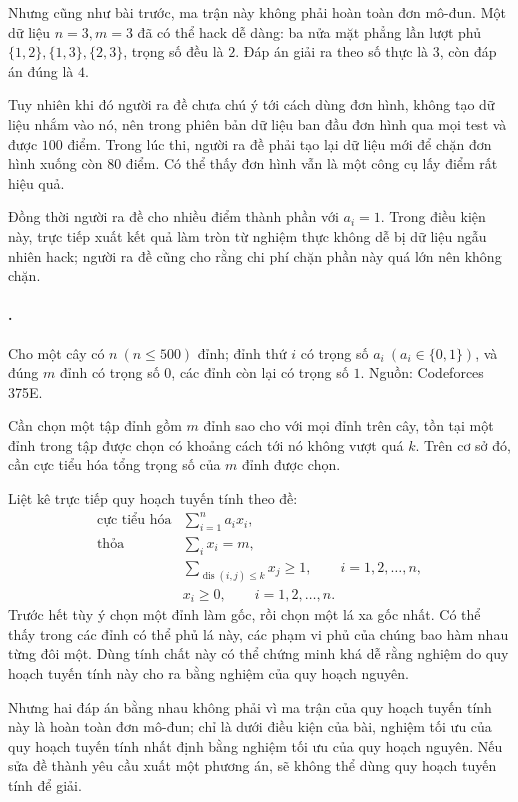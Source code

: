 \documentclass[11pt]{article}
\begin{document}
Nhưng cũng như bài trước, ma trận này không phải hoàn toàn đơn mô-đun. Một dữ
liệu \(n=3,m=3\) đã có thể hack dễ dàng: ba nửa mặt phẳng lần lượt phủ
\(\{1,2\},\{1,3\},\{2,3\}\), trọng số đều là \(2\). Đáp án giải ra theo số
thực là \(3\), còn đáp án đúng là \(4\).

Tuy nhiên khi đó người ra đề chưa chú ý tới cách dùng đơn hình, không tạo dữ
liệu nhắm vào nó, nên trong phiên bản dữ liệu ban đầu đơn hình qua mọi test
và được \(100\) điểm. Trong lúc thi, người ra đề phải tạo lại dữ liệu mới để
chặn đơn hình xuống còn \(80\) điểm. Có thể thấy đơn hình vẫn là một công cụ
lấy điểm rất hiệu quả.

Đồng thời người ra đề cho nhiều điểm thành phần với \(a_i=1\). Trong điều
kiện này, trực tiếp xuất kết quả làm tròn từ nghiệm thực không dễ bị dữ liệu
ngẫu nhiên hack; người ra đề cũng cho rằng chi phí chặn phần này quá lớn nên
không chặn.

\paragraph{.}
Cho một cây có \(n\ (n\le 500)\) đỉnh; đỉnh thứ \(i\) có trọng số
\(a_i\ (a_i\in\{0,1\})\), và đúng \(m\) đỉnh có trọng số \(0\), các đỉnh còn
lại có trọng số \(1\). Nguồn: Codeforces 375E.

Cần chọn một tập đỉnh gồm \(m\) đỉnh sao cho với mọi đỉnh trên cây, tồn tại
một đỉnh trong tập được chọn có khoảng cách tới nó không vượt quá \(k\). Trên
cơ sở đó, cần cực tiểu hóa tổng trọng số của \(m\) đỉnh được chọn.

Liệt kê trực tiếp quy hoạch tuyến tính theo đề:
\[
\begin{array}{ll}
\text{cực tiểu hóa} & \displaystyle \sum_{i=1}^{n}a_ix_i,\\[0.4em]
\text{thỏa} & \displaystyle \sum_i x_i=m,\\[0.4em]
& \displaystyle \sum_{\operatorname{dis}(i,j)\le k}x_j\ge 1,
  \qquad i=1,2,\ldots,n,\\[0.4em]
& x_i\ge 0,\qquad i=1,2,\ldots,n.
\end{array}
\]
Trước hết tùy ý chọn một đỉnh làm gốc, rồi chọn một lá xa gốc nhất. Có thể
thấy trong các đỉnh có thể phủ lá này, các phạm vi phủ của chúng bao hàm nhau
từng đôi một. Dùng tính chất này có thể chứng minh khá dễ rằng nghiệm do quy
hoạch tuyến tính này cho ra bằng nghiệm của quy hoạch nguyên.

Nhưng hai đáp án bằng nhau không phải vì ma trận của quy hoạch tuyến tính này
là hoàn toàn đơn mô-đun; chỉ là dưới điều kiện của bài, nghiệm tối ưu của quy
hoạch tuyến tính nhất định bằng nghiệm tối ưu của quy hoạch nguyên. Nếu sửa
đề thành yêu cầu xuất một phương án, sẽ không thể dùng quy hoạch tuyến tính để
giải.
\end{document}
